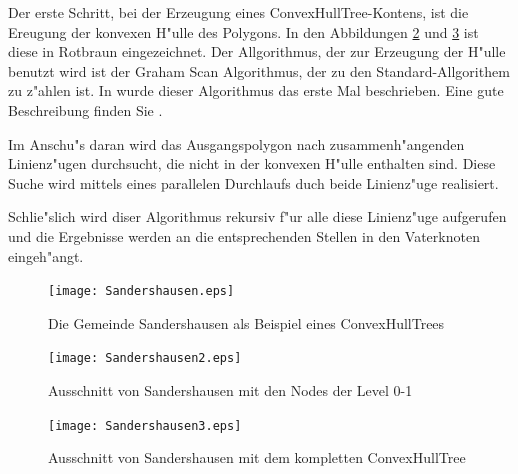 Der erste Schritt, bei der Erzeugung eines ConvexHullTree-Kontens, ist die Ereugung der konvexen H"ulle des Polygons. In den Abbildungen \ref{fig:sand2} und \ref{fig:sanders3} ist diese in Rotbraun eingezeichnet. Der Allgorithmus, der zur Erzeugung der H"ulle benutzt wird ist der Graham Scan Algorithmus, der zu den Standard-Allgorithem zu z"ahlen ist. In \cite{G72} wurde dieser Algorithmus das erste Mal beschrieben. Eine gute Beschreibung finden Sie .

Im Anschu"s daran wird das Ausgangspolygon nach zusammenh"angenden Linienz"ugen durchsucht, die nicht in der konvexen H"ulle enthalten sind. Diese Suche wird mittels eines parallelen Durchlaufs duch beide Linienz"uge realisiert.

Schlie"slich wird diser Algorithmus rekursiv f"ur alle diese Linienz"uge aufgerufen und die Ergebnisse werden an die entsprechenden Stellen in den Vaterknoten eingeh"angt.

\begin{figure}
	\centering
	\texttt{[image: Sandershausen.eps]}
	\caption{Die Gemeinde Sandershausen als Beispiel eines ConvexHullTrees}
	\label{fig:Sanders}
\end{figure}
\begin{figure}
	\centering
	\texttt{[image: Sandershausen2.eps]}
	\caption{Ausschnitt von Sandershausen mit den Nodes der Level 0-1}
	\label{fig:sand2}
\end{figure}
\begin{figure}
	\centering
	\texttt{[image: Sandershausen3.eps]}
	\caption{Ausschnitt von Sandershausen mit dem kompletten ConvexHullTree}
	\label{fig:sanders3}
\end{figure}


